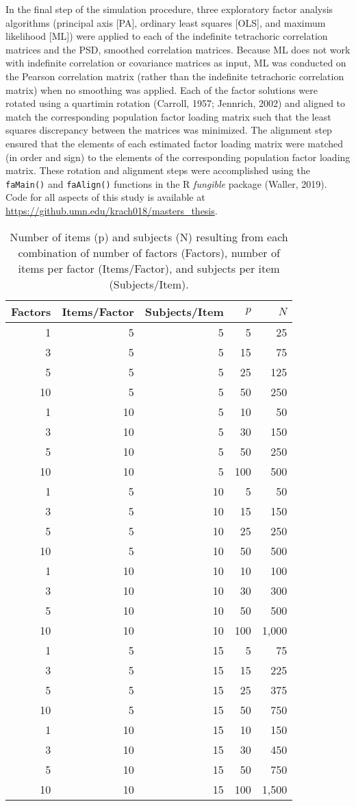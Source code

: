 \documentclass[
  english,
  man]{apa6}
\begin{document}
In the final step of the simulation procedure, three exploratory factor analysis algorithms (principal axis {[}PA{]}, ordinary least squares {[}OLS{]}, and maximum likelihood {[}ML{]}) were applied to each of the indefinite tetrachoric correlation matrices and the PSD, smoothed correlation matrices. Because ML does not work with indefinite correlation or covariance matrices as input, ML was conducted on the Pearson correlation matrix (rather than the indefinite tetrachoric correlation matrix) when no smoothing was applied. Each of the factor solutions were rotated using a quartimin rotation (Carroll, 1957; Jennrich, 2002) and aligned to match the corresponding population factor loading matrix such that the least squares discrepancy between the matrices was minimized. The alignment step ensured that the elements of each estimated factor loading matrix were matched (in order and sign) to the elements of the corresponding population factor loading matrix. These rotation and alignment steps were accomplished using the \texttt{faMain()} and \texttt{faAlign()} functions in the R \emph{fungible} package (Waller, 2019). Code for all aspects of this study is available at \url{https://github.umn.edu/krach018/masters_thesis}.

\begin{longtable}[t]{rrrrr}
\caption{\label{tab:items-subjects-table}Number of items (p) and subjects (N) resulting from each combination of number of factors (Factors), number of items per factor (Items/Factor), and subjects per item (Subjects/Item).}\\
\toprule
Factors & Items/Factor & Subjects/Item & $p$ & $N$\\
\midrule
1 & 5 & 5 & 5 & 25\\
3 & 5 & 5 & 15 & 75\\
5 & 5 & 5 & 25 & 125\\
10 & 5 & 5 & 50 & 250\\
1 & 10 & 5 & 10 & 50\\
3 & 10 & 5 & 30 & 150\\
5 & 10 & 5 & 50 & 250\\
10 & 10 & 5 & 100 & 500\\
1 & 5 & 10 & 5 & 50\\
3 & 5 & 10 & 15 & 150\\
5 & 5 & 10 & 25 & 250\\
10 & 5 & 10 & 50 & 500\\
1 & 10 & 10 & 10 & 100\\
3 & 10 & 10 & 30 & 300\\
5 & 10 & 10 & 50 & 500\\
10 & 10 & 10 & 100 & 1,000\\
1 & 5 & 15 & 5 & 75\\
3 & 5 & 15 & 15 & 225\\
5 & 5 & 15 & 25 & 375\\
10 & 5 & 15 & 50 & 750\\
1 & 10 & 15 & 10 & 150\\
3 & 10 & 15 & 30 & 450\\
5 & 10 & 15 & 50 & 750\\
10 & 10 & 15 & 100 & 1,500\\
\bottomrule
\end{longtable}
\end{document}
